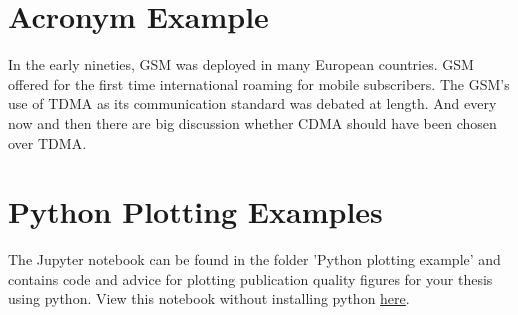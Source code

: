 \section{Acronym Example}\label{sec:acro_example}


In the early nineties, \acs{GSM} was deployed in many European countries. \ac{GSM} offered for the first time international roaming for mobile subscribers. The \acs{GSM}’s use of \ac{TDMA} as its communication standard was debated at length. And every now and then there are big discussion whether \ac{CDMA} should have been chosen over \ac{TDMA}.

\section{Python Plotting Examples}

The Jupyter notebook can be found in the folder 'Python plotting example' and contains code and advice for plotting publication quality figures for your thesis using python. View this notebook without installing python \href{https://nbviewer.jupyter.org/github/blairium/ltu-thesis/blob/97c95023caed8c8055ad905a8f68ad73061df8ad/Python_plotting_example/Plotting_Example.ipynb}{here}.



